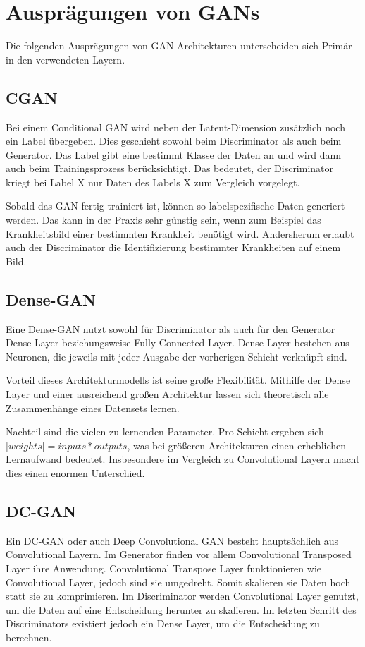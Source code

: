 \section{Ausprägungen von GANs}
Die folgenden Ausprägungen von GAN Architekturen unterscheiden sich Primär in den verwendeten Layern.

\subsection{CGAN}
Bei einem Conditional GAN wird neben der Latent-Dimension zusätzlich noch ein Label übergeben.
Dies geschieht sowohl beim Discriminator als auch beim Generator.
Das Label gibt eine bestimmt Klasse der Daten an und wird dann auch beim Trainingsprozess berücksichtigt.
Das bedeutet, der Discriminator kriegt bei Label X nur Daten des Labels X zum Vergleich vorgelegt.
\newline

Sobald das GAN fertig trainiert ist, können so labelspezifische Daten generiert werden.
Das kann in der Praxis sehr günstig sein, wenn zum Beispiel das Krankheitsbild einer bestimmten Krankheit benötigt wird.
Andersherum  erlaubt auch der Discriminator die Identifizierung bestimmter Krankheiten auf einem Bild.

\subsection{Dense-GAN}
Eine Dense-GAN nutzt sowohl für Discriminator als auch für den Generator Dense Layer beziehungsweise Fully Connected Layer.
Dense Layer bestehen aus Neuronen, die jeweils mit jeder Ausgabe der vorherigen Schicht verknüpft sind.

Vorteil dieses Architekturmodells ist seine große Flexibilität.
Mithilfe der Dense Layer und einer ausreichend großen Architektur lassen sich theoretisch alle Zusammenhänge eines Datensets lernen.

Nachteil sind die vielen zu lernenden Parameter.
Pro Schicht ergeben sich $|weights| = inputs * outputs$, was bei größeren Architekturen einen erheblichen Lernaufwand bedeutet.
Insbesondere im Vergleich zu Convolutional Layern macht dies einen enormen Unterschied.

\subsection{DC-GAN}
Ein DC-GAN oder auch Deep Convolutional GAN besteht hauptsächlich aus Convolutional Layern.
Im Generator finden vor allem Convolutional Transposed Layer ihre Anwendung.
Convolutional Transpose Layer funktionieren wie Convolutional Layer, jedoch sind sie umgedreht.
Somit skalieren sie Daten hoch statt sie zu komprimieren.
Im Discriminator werden Convolutional Layer genutzt, um die Daten auf eine Entscheidung herunter zu skalieren.
Im letzten Schritt des Discriminators existiert jedoch ein Dense Layer, um die Entscheidung zu berechnen.
\newline

